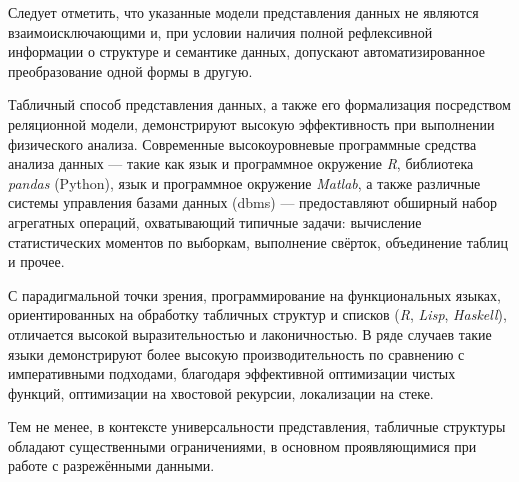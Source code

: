 Следует отметить, что указанные модели представления данных не являются
взаимоисключающими и, при условии наличия полной рефлексивной информации
о структуре и семантике данных, допускают автоматизированное преобразование
одной формы в другую.

Табличный способ представления данных, а также его формализация
посредством реляционной модели, демонстрируют высокую эффективность
при выполнении физического анализа. Современные высокоуровневые
программные средства анализа данных --- такие
как язык и программное окружение \emph{R},
библиотека \emph{pandas} (Python), язык и программное
окружение \emph{Matlab}, а также различные системы управления
базами данных (\acrshort{dbms}) — предоставляют обширный
набор агрегатных операций, охватывающий типичные задачи: вычисление
статистических моментов по выборкам, выполнение свёрток, объединение
таблиц и прочее.

С парадигмальной точки зрения, программирование на функциональных языках, ориентированных на обработку табличных структур и списков (\emph{R}, \emph{Lisp}, \emph{Haskell}), отличается высокой выразительностью и лаконичностью. В ряде случаев такие языки демонстрируют более высокую производительность по сравнению с императивными подходами, благодаря эффективной оптимизации чистых функций,
оптимизации на хвостовой рекурсии, локализации на стеке.

Тем не менее, в контексте универсальности представления,
табличные структуры обладают существенными ограничениями,
в основном проявляющимися при работе с разрежёнными данными.

